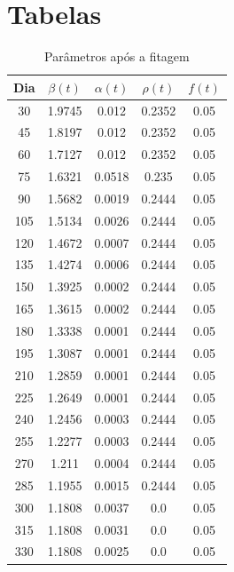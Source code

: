 \documentclass{article}
\begin{document}
\section*{Tabelas}

\begin{table}[H]
    \centering
    \begin{tabular}{c|c|c|c|c}
        Dia & $\beta(t)$ & $\alpha(t)$ & $\rho(t)$ & $f(t)$ \\ \hline
        30 & 1.9745 & 0.012 & 0.2352 & 0.05 \\
        45 & 1.8197 & 0.012 & 0.2352 & 0.05 \\
        60 & 1.7127 & 0.012 & 0.2352 & 0.05 \\
        75 & 1.6321 & 0.0518 & 0.235 & 0.05 \\
        90 & 1.5682 & 0.0019 & 0.2444 & 0.05 \\
        105 & 1.5134 & 0.0026 & 0.2444 & 0.05 \\
        120 & 1.4672 & 0.0007 & 0.2444 & 0.05 \\
        135 & 1.4274 & 0.0006 & 0.2444 & 0.05 \\
        150 & 1.3925 & 0.0002 & 0.2444 & 0.05 \\
        165 & 1.3615 & 0.0002 & 0.2444 & 0.05 \\
        180 & 1.3338 & 0.0001 & 0.2444 & 0.05 \\
        195 & 1.3087 & 0.0001 & 0.2444 & 0.05 \\
        210 & 1.2859 & 0.0001 & 0.2444 & 0.05 \\
        225 & 1.2649 & 0.0001 & 0.2444 & 0.05 \\
        240 & 1.2456 & 0.0003 & 0.2444 & 0.05 \\
        255 & 1.2277 & 0.0003 & 0.2444 & 0.05 \\
        270 & 1.211 & 0.0004 & 0.2444 & 0.05 \\
        285 & 1.1955 & 0.0015 & 0.2444 & 0.05 \\
        300 & 1.1808 & 0.0037 & 0.0 & 0.05 \\
        315 & 1.1808 & 0.0031 & 0.0 & 0.05 \\
        330 & 1.1808 & 0.0025 & 0.0 & 0.05
    \end{tabular}
    \caption{Parâmetros após a fitagem}
    \label{param}
\end{table}

\printbibliography
\end{document}
